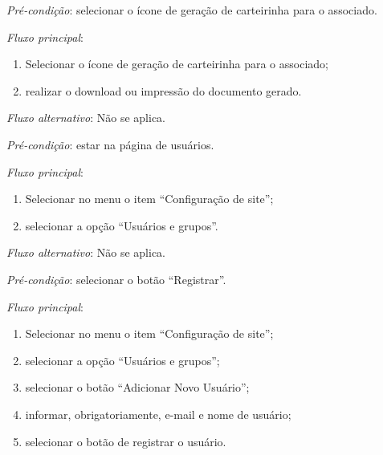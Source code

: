 \vspace{0.7cm}

\noindent \textit{Pré-condição}: selecionar o ícone de geração de carteirinha para o associado.

\noindent \textit{Fluxo principal}:

\begin{enumerate}
    \item Selecionar o ícone de geração de carteirinha para o associado;
    \item realizar o download ou impressão do documento gerado.
\end{enumerate}

\noindent \textit{Fluxo alternativo}: Não se aplica.


\vspace{0.7cm}

\noindent \textit{Pré-condição}: estar na página de usuários.

\noindent \textit{Fluxo principal}:

\begin{enumerate}
    \item Selecionar no menu o item ``Configuração de site'';
    \item selecionar a opção ``Usuários e grupos''.
\end{enumerate}

\noindent \textit{Fluxo alternativo}: Não se aplica.



\vspace{0.7cm}

\noindent \textit{Pré-condição}: selecionar o botão ``Registrar''.

\noindent \textit{Fluxo principal}:

\begin{enumerate}
    \item Selecionar no menu o item ``Configuração de site'';
    \item selecionar a opção ``Usuários e grupos'';
    \item selecionar o botão ``Adicionar Novo Usuário'';
    \item informar, obrigatoriamente, e-mail e nome de usuário;
    \item selecionar o botão de registrar o usuário.
\end{enumerate}

